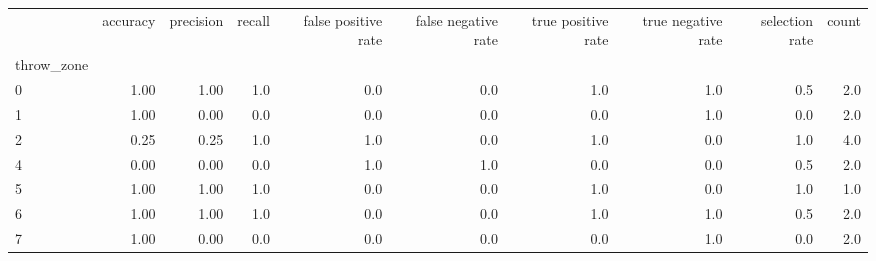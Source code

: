 \begin{tabular}{lrrrrrrrrr}
\toprule
{} &  accuracy &  precision &  recall &  false positive rate &  false negative rate &  true positive rate &  true negative rate &  selection rate &  count \\
throw\_zone &           &            &         &                      &                      &                     &                     &                 &        \\
\midrule
0          &      1.00 &       1.00 &     1.0 &                  0.0 &                  0.0 &                 1.0 &                 1.0 &             0.5 &    2.0 \\
1          &      1.00 &       0.00 &     0.0 &                  0.0 &                  0.0 &                 0.0 &                 1.0 &             0.0 &    2.0 \\
2          &      0.25 &       0.25 &     1.0 &                  1.0 &                  0.0 &                 1.0 &                 0.0 &             1.0 &    4.0 \\
4          &      0.00 &       0.00 &     0.0 &                  1.0 &                  1.0 &                 0.0 &                 0.0 &             0.5 &    2.0 \\
5          &      1.00 &       1.00 &     1.0 &                  0.0 &                  0.0 &                 1.0 &                 0.0 &             1.0 &    1.0 \\
6          &      1.00 &       1.00 &     1.0 &                  0.0 &                  0.0 &                 1.0 &                 1.0 &             0.5 &    2.0 \\
7          &      1.00 &       0.00 &     0.0 &                  0.0 &                  0.0 &                 0.0 &                 1.0 &             0.0 &    2.0 \\
\bottomrule
\end{tabular}
